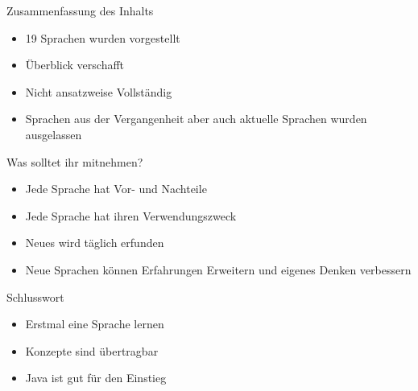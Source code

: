 \begin{frame}{Zusammenfassung des Inhalts}
    
    \begin{itemize}
        \item 19 Sprachen wurden vorgestellt
        \item Überblick verschafft
        \item Nicht ansatzweise Vollständig
        \item Sprachen aus der Vergangenheit aber auch aktuelle Sprachen wurden ausgelassen
    \end{itemize}

\end{frame}

\begin{frame}{Was solltet ihr mitnehmen?}
    
    \begin{itemize}
        \item Jede Sprache hat Vor- und Nachteile
        \item Jede Sprache hat ihren Verwendungszweck
        \item Neues wird täglich erfunden
        \item Neue Sprachen können Erfahrungen Erweitern und eigenes Denken verbessern
    \end{itemize}

\end{frame}

\begin{frame}{Schlusswort}
    
    \begin{itemize}
        \item Erstmal eine Sprache lernen
        \item Konzepte sind übertragbar
        \item Java ist gut für den Einstieg
    \end{itemize}

\end{frame}
